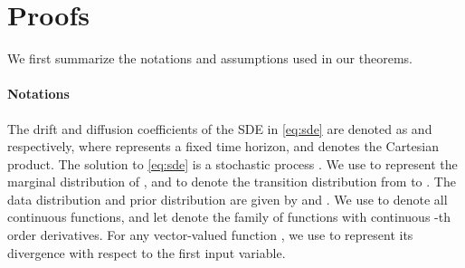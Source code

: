 \section{Proofs}\label{app:proof}
We first summarize the notations and assumptions used in our theorems.
\paragraph{Notations} 
The drift and diffusion coefficients of the SDE in \cref{eq:sde} are denoted as  and  respectively, where  represents a fixed time horizon, and  denotes the Cartesian product. The solution to \cref{eq:sde} is a stochastic process . We use  to represent the marginal distribution of , and  to denote the transition distribution from  to . The data distribution and prior distribution are given by  and . We use  to denote all continuous functions, and let  denote the family of functions with continuous -th order derivatives. For any vector-valued function , we use  to represent its divergence with respect to the first input variable.
